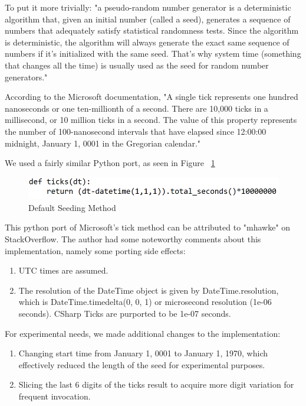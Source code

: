 \documentclass[conference]{IEEEtran}
\begin{document}
To put it more trivially: "a pseudo-random number generator is a deterministic algorithm that, given an initial number (called a seed), generates a sequence of numbers that adequately satisfy statistical randomness tests. Since the algorithm is deterministic, the algorithm will always generate the exact same sequence of numbers if it's initialized with the same seed. That's why system time (something that changes all the time) is usually used as the seed for random number generators." \cite{pseudoquote}

According to the Microsoft documentation, "A single tick represents one hundred nanoseconds or one ten-millionth of a second. There are 10,000 ticks in a millisecond, or 10 million ticks in a second. The value of this property represents the number of 100-nanosecond intervals that have elapsed since 12:00:00 midnight, January 1, 0001 in the Gregorian calendar." \cite{msoftdocs}

We used a fairly similar Python port, as seen in Figure ~\ref{fig:Default Seeding Method}

\begin{figure}[H]
\centering
\includegraphics[width=1\linewidth]{./Images/Ticks.png}
\caption{Default Seeding Method}
\label{fig:Default Seeding Method}
\end{figure}

This python port of Microsoft's tick method can be attributed to "mhawke" on StackOverflow. \cite{tickport} The author had some noteworthy comments about this implementation, namely some porting side effects:
\begin{enumerate}
    \item UTC times are assumed.
    \item The resolution of the DateTime object is given by DateTime.resolution, which is DateTime.timedelta(0, 0, 1) or microsecond resolution (1e-06 seconds). CSharp Ticks are purported to be 1e-07 seconds.
\end{enumerate}

For experimental needs, we made additional changes to the implementation:
\begin{enumerate}
    \item Changing start time from January 1, 0001 to January 1, 1970, which effectively reduced the length of the seed for experimental purposes.
    \item Slicing the last 6 digits of the ticks result to acquire more digit variation for frequent invocation.
\end{enumerate}
\end{document}
